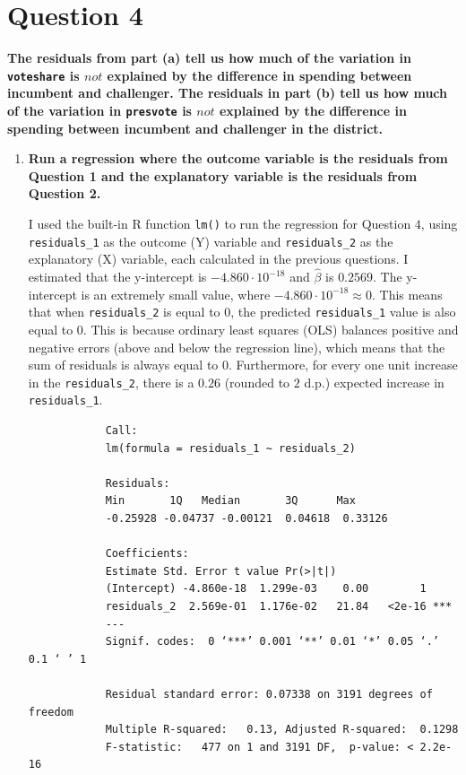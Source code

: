 \documentclass[12pt,letterpaper]{article}
\begin{document}
\section*{Question 4}
\noindent \textbf{The residuals from part (a) tell us how much of the variation in \texttt{voteshare} is $not$ explained by the difference in spending between incumbent and challenger. The residuals in part (b) tell us how much of the variation in \texttt{presvote} is $not$ explained by the difference in spending between incumbent and challenger in the district.}
	\begin{enumerate}
		\item \textbf{Run a regression where the outcome variable is the residuals from Question 1 and the explanatory variable is the residuals from Question 2.}	\vspace{0cm}
		
		I used the built-in R function \texttt{lm()} to run the regression for Question $4$, using \texttt{residuals\_1} as the outcome (Y) variable and \texttt{residuals\_2} as the explanatory (X) variable, each calculated in the previous questions. I estimated that the y-intercept is $-4.860 \cdot 10^{-18}$ and $\hat{\beta}$ is $0.2569$. The y-intercept is an extremely small value, where $-4.860 \cdot 10^{-18}  \approx 0$. This means that when \texttt{residuals\_2} is equal to 0, the predicted \texttt{residuals\_1} value is also equal to $0$. This is because ordinary least squares (OLS) balances positive and negative errors (above and below the regression line), which means that the sum of residuals is always equal to $0$. Furthermore, for every one unit increase in the \texttt{residuals\_2}, there is a $0.26$ (rounded to $2$ d.p.) expected increase in \texttt{residuals\_1}.
		
		  
		
		\begin{verbatim}
			Call:
			lm(formula = residuals_1 ~ residuals_2)
			
			Residuals:
			Min       1Q   Median       3Q      Max 
			-0.25928 -0.04737 -0.00121  0.04618  0.33126 
			
			Coefficients:
			Estimate Std. Error t value Pr(>|t|)    
			(Intercept) -4.860e-18  1.299e-03    0.00        1    
			residuals_2  2.569e-01  1.176e-02   21.84   <2e-16 ***
			---
			Signif. codes:  0 ‘***’ 0.001 ‘**’ 0.01 ‘*’ 0.05 ‘.’ 0.1 ‘ ’ 1
			
			Residual standard error: 0.07338 on 3191 degrees of freedom
			Multiple R-squared:   0.13,	Adjusted R-squared:  0.1298 
			F-statistic:   477 on 1 and 3191 DF,  p-value: < 2.2e-16
		\end{verbatim}
		

\end{enumerate}
\end{document}
